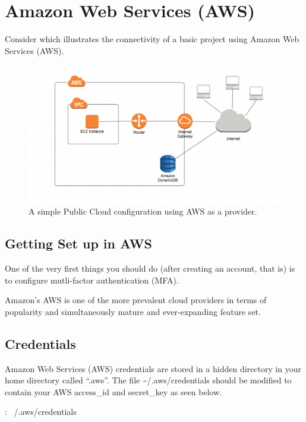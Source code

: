 \section{Amazon Web Services (AWS)}

\justify{}
Consider which illustrates the connectivity of a basic
project using Amazon Web Services (AWS).

\begin{figure}
  \includegraphics[scale=0.45]{images/ddb-no-vpc-endpoint-1024x561.png}
  \caption{A simple Public Cloud configuration using AWS as a provider.}
\label{aws}
\end{figure}

\subsection{Getting Set up in AWS}

\justify{}
One of the very first things you should do (after creating an account,
that is) is to configure mutli-factor authentication (MFA).

\justify{}
Amazon's AWS is one of the more prevalent cloud providers in terms of
popularity and simultaneously mature and ever-expanding feature set.

\subsection{Credentials}
\justify{}
Amazon Web Services (AWS) credentials are stored in a hidden directory
in your home directory called ``.aws''. The file
\textasciitilde{}/.aws/credentials should be modified to contain your
AWS access\_id and secret\_key as seen below.

\begin{mybox}{\thetcbcounter: ~/.aws/credentials}
  
\end{mybox}

